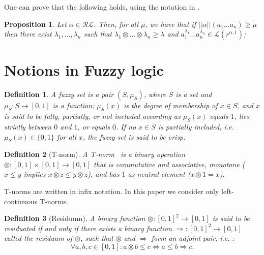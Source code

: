 \documentclass{article}
\def\ie{{\em i.e. }}
\newtheorem{definition}{Definition}[section]
\newtheorem{proposition}{Proposition}[section]
\begin{document}
One can prove that the following holds, using the notation in \cite{SC12}.
\begin{proposition} Let $\alpha \in \mathcal R \mathcal L$. Then, for all $\mu$, we have that if $||\alpha ||(a_1\ldots a_n)\geq \mu$ then there exist $\lambda_1,\ldots, \lambda_n$ such that $\lambda_1\otimes \ldots \otimes \lambda_n\geq \lambda$ and $a_1^{\lambda_1}\ldots a_n^{\lambda_n}\in \mathcal L(r^{\alpha,1})$;
\end{proposition}

\appendix
\section{Notions in Fuzzy logic}
\label{appendix}


\begin{definition}A \emph{fuzzy set} is a pair $(S, \mu_S)$, where $S$ is a set and
$\mu_S: S\rightarrow [0,1]$ is a function; $\mu_S(x)$ is the \emph{degree of membership}
of $x\in S$, and $x$ is said to be \emph{fully}, \emph{partially}, or \emph{not} included
according as $\mu_S(x)$ equals $1$, lies strictly between $0$ and $1$, or equals $0$.
If no $x\in S$ is partially included, \ie $\mu_S(x)\in\{0,1\}$ for all $x$, the fuzzy set is said to be {\em crisp}.
\end{definition}


\begin{definition}[T-norm]\label{T-norm}
A \emph{T-norm}~\cite{met05} is a binary operation
$\otimes:[0,1]\times[0,1]\to[0,1]$ that is commutative and associative, monotone
($x\le y$ implies $x\otimes z \le y\otimes z$), and has $1$ as neutral element
($x\otimes 1 = x$).
\end{definition}

\noindent T-norms are written in infix notation. In this paper we consider only
left-continuous T-norms.

\begin{definition}[Residuum] \label{residuum}A binary function $\otimes: [0,1]^2 \rightarrow [0, 1] $ is said to be residuated
if and only if there exists a binary function $\Rightarrow : [0, 1]^2 \rightarrow [0, 1]$ called the \emph{residuum of $\otimes$}, such
that $\otimes$ and $\Rightarrow$ form an adjoint pair, \ie:
\[\forall a,b, c\in [0,1] : a\otimes b \leq c \Leftrightarrow a \leq b \Rightarrow c .\]
\end{definition}
\end{document}
